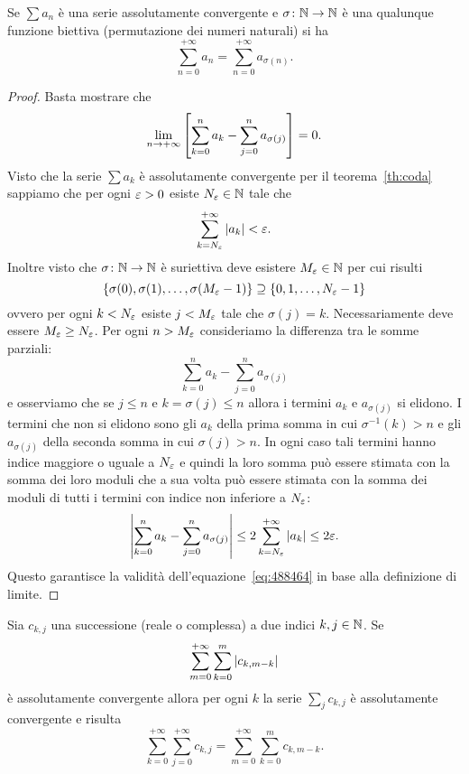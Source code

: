 \begin{theorem}%
\label{th:convergenza_incondizionata}%
\mymark{*}%
%
Se $\sum a_n$ è una serie assolutamente convergente e $\sigma\colon \mathbb N \to \mathbb N$
è una qualunque funzione biettiva (permutazione dei numeri naturali)
si ha
\[
  \sum_{n=0}^{+\infty} a_n = \sum_{n=0}^{+\infty} a_{\sigma(n)}.
\]
\end{theorem}
%
\begin{proof}
Basta mostrare che
\begin{equation}
\label{eq:488464}
\lim_{n\to +\infty} {\left[ \sum_{k=0}^n a_k
 - \sum_{j=0}^n a_{\sigma(j)} \right]} = 0.
\end{equation}
Visto che la serie $\sum a_k$ è assolutamente convergente
per il teorema~\ref{th:coda} sappiamo
che per ogni $\varepsilon>0$ esiste $N_\varepsilon\in \mathbb N$ tale che
\[
  \sum_{k=N_\varepsilon}^{+\infty} {\left|a_k\right|} < \varepsilon.
\]
Inoltre visto che $\sigma\colon \mathbb N \to \mathbb N$ è suriettiva
deve esistere $M_\varepsilon \in \mathbb N$ per cui risulti
\[
 {\left\{ \sigma(0), \sigma(1), \dots, \sigma(M_\varepsilon-1) \right\}}
 \supseteq {\left\{ 0,1,\dots, N_\varepsilon- 1 \right\}}
\]
ovvero per ogni $k<N_\varepsilon$ esiste $j<M_\varepsilon$ tale
che $\sigma(j)=k$.
Necessariamente deve essere $M_\varepsilon\ge N_\varepsilon$.
Per ogni $n>M_\varepsilon$ consideriamo
la differenza tra le somme parziali:
\[
\sum_{k=0}^n a_k - \sum_{j=0}^n a_{\sigma(j)}
\]
e osserviamo che se $j\le n$ e $k=\sigma(j)\le n$ allora
i termini $a_k$ e $a_{\sigma(j)}$ si elidono.
I termini che non si elidono sono gli $a_k$ della prima somma
in cui $\sigma^{-1}(k)>n$ e gli $a_{\sigma(j)}$
della seconda somma in cui $\sigma(j)>n$.
In ogni caso tali termini hanno indice maggiore
o uguale a $N_\varepsilon$ e quindi la loro somma
può essere stimata con la somma dei loro moduli
che a sua volta può essere stimata con la somma
dei moduli di tutti i termini con indice
non inferiore a $N_\varepsilon$:
\begin{align*}
  {\left|\sum_{k=0}^n a_k - \sum_{j=0}^n a_{\sigma(j)}\right|}
  \le 2 \sum_{k=N_\varepsilon}^{+\infty} {\left|a_k\right|} \le 2\varepsilon.
\end{align*}
Questo garantisce la validità dell'equazione~\eqref{eq:488464} in base
alla definizione di limite.
\end{proof}

\begin{theorem}%
\label{th:somma_Cauchy}%
Sia $c_{k,j}$ una successione (reale o complessa)
a due indici $k,j\in \mathbb N$.
Se
\[
  \sum_{m=0}^{+\infty} \sum_{k=0}^m {\left|c_{k,m-k}\right|}
\]
è assolutamente convergente
allora per ogni $k$ la serie $\sum_j c_{k,j}$ è
assolutamente convergente e risulta
\[
  \sum_{k=0}^{+\infty} \sum_{j=0}^{+\infty} c_{k,j}
  = \sum_{m=0}^{+\infty} \sum_{k=0}^m c_{k,m-k}.
\]
\end{theorem}

